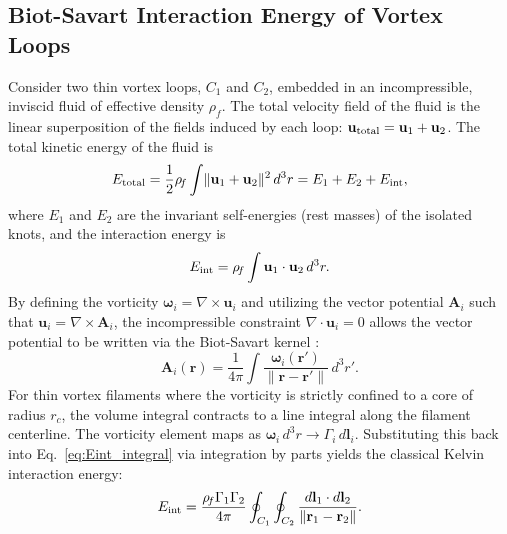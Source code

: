 \documentclass[10pt]{article}
\begin{document}
    \subsection{Biot-Savart Interaction Energy of Vortex Loops}
        Consider two thin vortex loops, $C_1$ and $C_2$, embedded in an incompressible, inviscid fluid of effective density $\rho_{\!f}$. The total velocity field of the fluid is the linear superposition of the fields induced by each loop: $\mathbf{u}_{\rm total} = \mathbf{u}_1 + \mathbf{u}_2$. The total kinetic energy of the fluid is
        \begin{equation}
            \label{eq:Etotal_fluid}
            E_{\rm total} = \frac{1}{2}\rho_{\!f} \int \lVert \mathbf{u}_1 + \mathbf{u}_2 \rVert^2 \, d^3r
            = E_1 + E_2 + E_{\rm int},
        \end{equation}
        where $E_1$ and $E_2$ are the invariant self-energies (rest masses) of the isolated knots, and the interaction energy is
        \begin{equation}
            \label{eq:Eint_integral}
            E_{\rm int} = \rho_{\!f} \int \mathbf{u}_1 \cdot \mathbf{u}_2 \, d^3r.
        \end{equation}
        By defining the vorticity $\boldsymbol{\omega}_i = \nabla \times \mathbf{u}_i$ and utilizing the vector potential $\mathbf{A}_i$ such that $\mathbf{u}_i = \nabla \times \mathbf{A}_i$, the incompressible constraint $\nabla \cdot \mathbf{u}_i = 0$ allows the vector potential to be written via the Biot-Savart kernel \cite{Batchelor1967}:
        \begin{equation}
            \label{eq:VectorPotential}
            \mathbf{A}_i(\mathbf{r}) = \frac{1}{4\pi} \int \frac{\boldsymbol{\omega}_i(\mathbf{r}')}{\lVert \mathbf{r} - \mathbf{r}' \rVert} \, d^3r'.
        \end{equation}
        For thin vortex filaments where the vorticity is strictly confined to a core of radius $r_c$, the volume integral contracts to a line integral along the filament centerline. The vorticity element maps as $\boldsymbol{\omega}_i \, d^3r \to \Gamma_i \, d\mathbf{l}_i$. Substituting this back into Eq.~\eqref{eq:Eint_integral} via integration by parts yields the classical Kelvin interaction energy:
        \begin{equation}
            \label{eq:BiotSavartEnergy}
            E_{\rm int} = \frac{\rho_{\!f} \Gamma_1 \Gamma_2}{4\pi} \oint_{C_1} \oint_{C_2} \frac{d\mathbf{l}_1 \cdot d\mathbf{l}_2}{\lVert \mathbf{r}_1 - \mathbf{r}_2 \rVert}.
        \end{equation}
    
\end{document}
